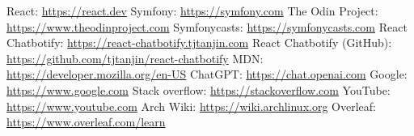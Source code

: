\documentclass[12pt,a4paper,oneside]{book}
\begin{document}
\mainmatter
















\renewcommand{\appendixname}{Annexe}

\appendix






% 

\renewcommand{\bibname}{Ressources}

\begin{thebibliography}{99}

\bibitem{}
React: \url{https://react.dev}
\bibitem{}
Symfony: \url{https://symfony.com}
\bibitem{}
The Odin Project: \url{https://www.theodinproject.com}
\bibitem{}
Symfonycasts: \url{https://symfonycasts.com}
\bibitem{}
React Chatbotify: \url{https://react-chatbotify.tjtanjin.com}
\bibitem{}
React Chatbotify (GitHub): \url{https://github.com/tjtanjin/react-chatbotify}
\bibitem{}
MDN: \url{https://developer.mozilla.org/en-US}
\bibitem{}
ChatGPT: \url{https://chat.openai.com}
\bibitem{}
Google: \url{https://www.google.com}
\bibitem{}
Stack overflow: \url{https://stackoverflow.com}
\bibitem{}
YouTube: \url{https://www.youtube.com}
\bibitem{}
Arch Wiki: \url{https://wiki.archlinux.org}
\bibitem{}
Overleaf: \url{https://www.overleaf.com/learn}




\end{thebibliography}
\end{document}

